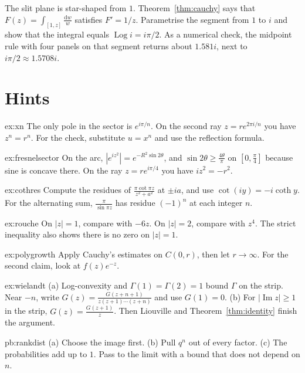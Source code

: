 \begin{exercise}[$\star\star\star$]\label{ex:rw09d}
The slit plane is star-shaped from $1$. Theorem~\ref{thm:cauchy} says that $F(z)=\int_{[1,z]}\frac{\mathrm dw}w$ satisfies $F'=1/z$. Parametrise the segment from $1$ to $i$ and show that the integral equals $\operatorname{Log} i=i\pi/2$. As a numerical check, the midpoint rule with four panels on that segment returns about $1.581i$, next to $i\pi/2\approx1.5708i$.
\end{exercise}
\section{Hints}

\begin{hint}{ex:xn}
The only pole in the sector is $e^{i\pi/n}$. On the second ray $z=re^{2\pi i/n}$ you have $z^n=r^n$. For the check, substitute $u=x^n$ and use the reflection formula.
\end{hint}
\begin{hint}{ex:fresnelsector}
On the arc, $|e^{iz^2}|=e^{-R^2\sin2\theta}$, and $\sin2\theta\ge\frac{4\theta}\pi$ on $[0,\frac\pi4]$ because sine is concave there. On the ray $z=re^{i\pi/4}$ you have $iz^2=-r^2$.
\end{hint}
\begin{hint}{ex:cothres}
Compute the residues of $\frac{\pi\cot\pi z}{z^2+a^2}$ at $\pm ia$, and use $\cot(iy)=-i\coth y$. For the alternating sum, $\frac\pi{\sin\pi z}$ has residue $(-1)^n$ at each integer $n$.
\end{hint}
\begin{hint}{ex:rouche}
On $|z|=1$, compare with $-6z$. On $|z|=2$, compare with $z^4$. The strict inequality also shows there is no zero on $|z|=1$.
\end{hint}
\begin{hint}{ex:polygrowth}
Apply Cauchy's estimates on $C(0,r)$, then let $r\to\infty$. For the second claim, look at $f(z)e^{-z}$.
\end{hint}
\begin{hint}{ex:wielandt}
(a) Log-convexity and $\Gamma(1)=\Gamma(2)=1$ bound $\Gamma$ on the strip. Near $-n$, write $G(z)=\frac{G(z+n+1)}{z(z+1)\cdots(z+n)}$ and use $G(1)=0$. (b) For $|\operatorname{Im}z|\ge1$ in the strip, $G(z)=\frac{G(z+1)}z$. Then Liouville and Theorem~\ref{thm:identity} finish the argument.
\end{hint}

\begin{hint}{pb:rankdist}
(a) Choose the image first. (b) Pull $q^{n}$ out of every factor. (c) The probabilities add up to $1$. Pass to the limit with a bound that does not depend on $n$.
\end{hint}

